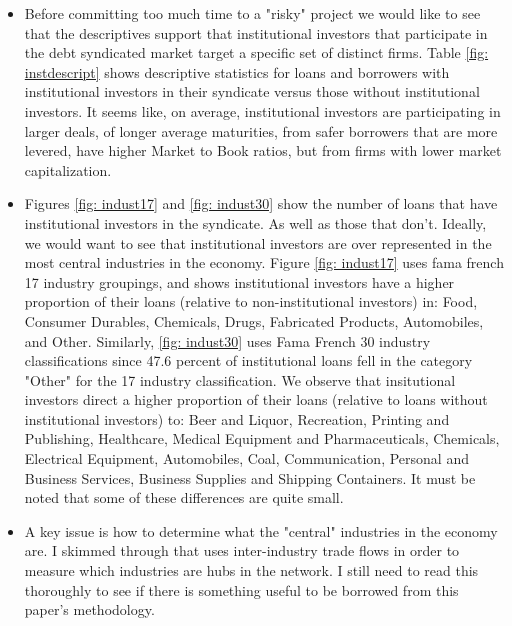 \documentclass[english, 3p]{elsarticle}
\begin{document}
\begin{itemize}
\item Before committing too much time to a "risky" project we would like to see that the descriptives support that institutional investors that participate in the debt syndicated market target a specific set of distinct firms. Table \ref{fig: instdescript} shows descriptive statistics for loans and borrowers with institutional investors in their syndicate versus those without institutional investors. It seems like, on average, institutional investors are participating in larger deals, of longer average maturities, from safer borrowers that are more levered, have higher Market to Book ratios, but from firms with lower market capitalization. 

\item Figures 	\ref{fig: indust17}  and 	\ref{fig: indust30} show the number of loans that have institutional investors in the syndicate. As well as those that don't. Ideally, we would want to see that institutional investors are over represented in the most central industries in the economy. Figure \ref{fig: indust17} uses fama french 17 industry groupings, and shows institutional investors have a higher proportion of their loans (relative to non-institutional investors) in:  Food, Consumer Durables, Chemicals, Drugs, Fabricated Products, Automobiles, and Other. Similarly, \ref{fig: indust30} uses Fama French 30 industry classifications since 47.6 percent of institutional loans fell in the category "Other" for the 17 industry classification. We observe that insitutional investors direct a higher proportion of their loans (relative to loans without institutional investors) to: Beer and Liquor, Recreation, Printing and Publishing, Healthcare, Medical Equipment and Pharmaceuticals, Chemicals, Electrical Equipment, Automobiles, Coal, Communication, Personal and Business Services, Business Supplies and Shipping Containers. It must be noted that some of these differences are quite small. 

\item A key issue is how to determine what the "central" industries in the economy are. I skimmed through \cite{Aobdia2014} that uses inter-industry trade flows in order to measure which industries are hubs in the network. I still need to read this thoroughly to see if there is something useful to be borrowed from this paper's methodology. 


\end{itemize}
\end{document}
